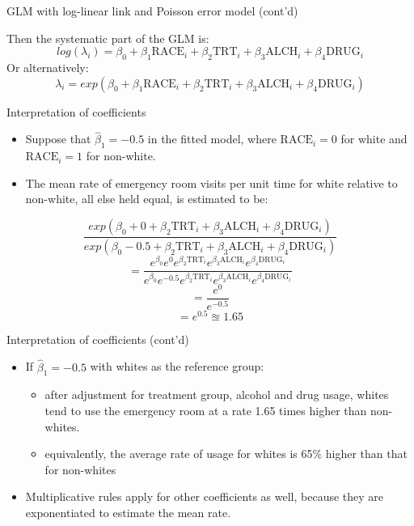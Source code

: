 \documentclass[
  ignorenonframetext,
]{beamer}
\providecommand{\tightlist}{%
  \setlength{\itemsep}{0pt}\setlength{\parskip}{0pt}}
\begin{document}
\begin{frame}{GLM with log-linear link and Poisson error model (cont'd)}
\protect\hypertarget{glm-with-log-linear-link-and-poisson-error-model-contd}{}

Then the systematic part of the GLM is: \[
log(\lambda_i) = \beta_0 + \beta_1 \textrm{RACE}_i + \beta_2 \textrm{TRT}_i + \beta_3 \textrm{ALCH}_i + \beta_4 \textrm{DRUG}_i
\] Or alternatively: \[
\lambda_i = exp \left( \beta_0 + \beta_1 \textrm{RACE}_i + \beta_2 \textrm{TRT}_i + \beta_3 \textrm{ALCH}_i + \beta_4 \textrm{DRUG}_i \right)
\]

\end{frame}

\begin{frame}{Interpretation of coefficients}
\protect\hypertarget{interpretation-of-coefficients}{}

\begin{itemize}
\tightlist
\item
  Suppose that \(\hat \beta_1 = -0.5\) in the fitted model, where
  \(\textrm{RACE}_i=0\) for white and \(\textrm{RACE}_i=1\) for
  non-white.
\item
  The mean rate of emergency room visits per unit time for white
  relative to non-white, all else held equal, is estimated to be:
\end{itemize}

\[
\frac{exp \left( \beta_0 + 0 + \beta_2 \textrm{TRT}_i + \beta_3 \textrm{ALCH}_i + \beta_4 \textrm{DRUG}_i \right)}{exp \left( \beta_0 - 0.5 + \beta_2 \textrm{TRT}_i + \beta_3 \textrm{ALCH}_i + \beta_4 \textrm{DRUG}_i \right)}
\] \[
= \frac{e^{\beta_0} e^0 e^{\beta_2 \textrm{TRT}_i} e^{\beta_3 \textrm{ALCH}_i} e^{\beta_4 \textrm{DRUG}_i}}
{e^{\beta_0} e^{-0.5} e^{\beta_2 \textrm{TRT}_i} e^{\beta_3 \textrm{ALCH}_i} e^{\beta_4 \textrm{DRUG}_i}}
\] \[
= \frac{e^0}{e^{-0.5}}
\] \[
= e^{0.5} \approxeq 1.65
\]

\end{frame}

\begin{frame}{Interpretation of coefficients (cont'd)}
\protect\hypertarget{interpretation-of-coefficients-contd}{}

\begin{itemize}
\tightlist
\item
  If \(\hat \beta_1=-0.5\) with whites as the reference group:

  \begin{itemize}
  \tightlist
  \item
    after adjustment for treatment group, alcohol and drug usage, whites
    tend to use the emergency room at a rate 1.65 times higher than
    non-whites.
  \item
    equivalently, the average rate of usage for whites is 65\% higher
    than that for non-whites
  \end{itemize}
\item
  Multiplicative rules apply for other coefficients as well, because
  they are exponentiated to estimate the mean rate.
\end{itemize}

\end{frame}
\end{document}
